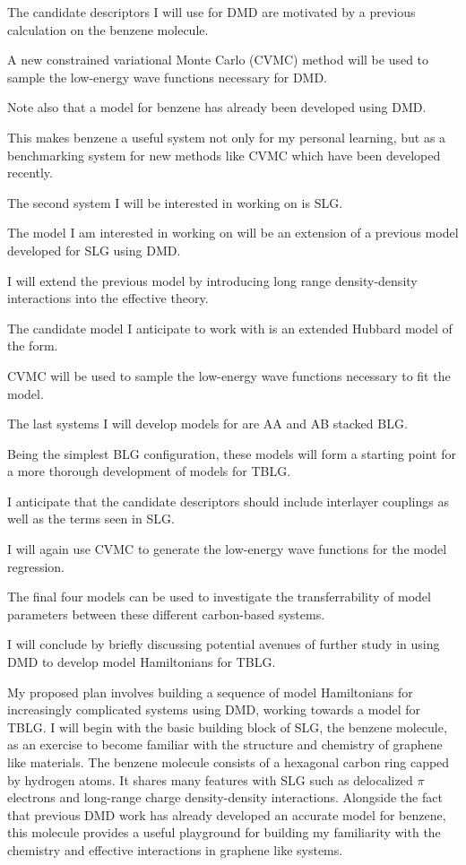 \documentclass[12pt]{article}
\begin{document}
The candidate descriptors I will use for DMD are motivated by a previous calculation on the benzene molecule.

A new constrained variational Monte Carlo (CVMC) method will be used to sample the low-energy wave functions necessary for DMD.

Note also that a model for benzene has already been developed using DMD.

This makes benzene a useful system not only for my personal learning, but as a benchmarking system for new methods like CVMC which have been developed recently.

The second system I will be interested in working on is SLG.

The model I am interested in working on will be an extension of a previous model developed for SLG using DMD.

I will extend the previous model by introducing long range density-density interactions into the effective theory.

The candidate model I anticipate to work with is an extended Hubbard model of the form.

CVMC will be used to sample the low-energy wave functions necessary to fit the model.

The last systems I will develop models for are AA and AB stacked BLG.

Being the simplest BLG configuration, these models will form a starting point for a more thorough development of models for TBLG.

I anticipate that the candidate descriptors should include interlayer couplings as well as the terms seen in SLG.

I will again use CVMC to generate the low-energy wave functions for the model regression.

The final four models can be used to investigate the transferrability of model parameters between these different carbon-based systems.

I will conclude by briefly discussing potential avenues of further study in using DMD to develop model Hamiltonians for TBLG. 

My proposed plan involves building a sequence of model Hamiltonians for increasingly complicated systems using DMD, working towards a model for TBLG.
I will begin with the basic building block of SLG, the benzene molecule, as an exercise to become familiar with the structure and chemistry of graphene like materials.
The benzene molecule consists of a hexagonal carbon ring capped by hydrogen atoms. 
It shares many features with SLG such as delocalized $\pi$ electrons and long-range charge density-density interactions.
Alongside the fact that previous DMD work has already developed an accurate model for benzene, this molecule provides a useful playground for building my familiarity with the chemistry and effective interactions in graphene like systems.
\end{document}
